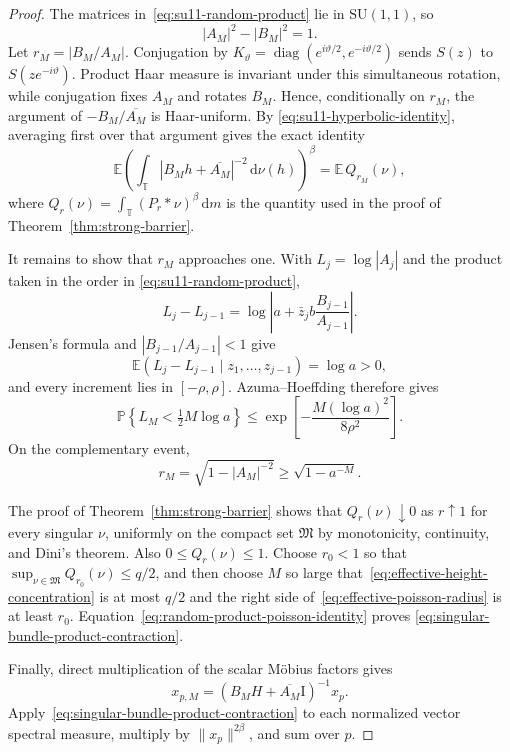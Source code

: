 \documentclass[11pt]{article}
\theoremstyle{remark}
\newcommand{\T}{\mathbb T}
\newcommand{\Id}{\mathrm I}
\newcommand{\dd}{\,\mathrm d}
\begin{document}
\begin{proof}
The matrices in~\eqref{eq:su11-random-product} lie in $\mathrm{SU}(1,1)$, so
\begin{equation}
 |A_M|^2-|B_M|^2=1.
 \label{eq:su11-hyperbolic-identity}
\end{equation}
Let $r_M=|B_M/A_M|$.  Conjugation by
$K_\vartheta=\operatorname{diag}(e^{i\vartheta/2},e^{-i\vartheta/2})$
sends $S(z)$ to $S(ze^{-i\vartheta})$.  Product Haar measure is invariant
under this simultaneous rotation, while conjugation fixes $A_M$ and rotates
$B_M$.  Hence, conditionally on $r_M$, the argument of
$-B_M/\overline{A_M}$ is Haar-uniform.  By
\eqref{eq:su11-hyperbolic-identity}, averaging first over that argument gives
the exact identity
\begin{equation}
 \mathbb E
 \left(
  \int_\T |B_Mh+\overline{A_M}|^{-2}\dd\nu(h)
 \right)^\beta
 =\mathbb E\,Q_{r_M}(\nu),
 \label{eq:random-product-poisson-identity}
\end{equation}
where $Q_r(\nu)=\int_\T(P_r*\nu)^\beta\dd m$ is the quantity used in the
proof of Theorem~\ref{thm:strong-barrier}.

It remains to show that $r_M$ approaches one.  With
$L_j=\log|A_j|$ and the product taken in the order in
\eqref{eq:su11-random-product},
\[
 L_j-L_{j-1}
 =\log\left|a+\bar z_jb\frac{B_{j-1}}{A_{j-1}}\right|.
\]
Jensen's formula and $|B_{j-1}/A_{j-1}|<1$ give
\begin{equation}
 \mathbb E(L_j-L_{j-1}\mid z_1,\ldots,z_{j-1})=\log a>0,
 \label{eq:positive-radial-drift}
\end{equation}
and every increment lies in $[-\rho,\rho]$.  Azuma--Hoeffding therefore gives
\begin{equation}
 \mathbb P\left\{L_M<\tfrac12M\log a\right\}
 \leq
 \exp\left[-\frac{M(\log a)^2}{8\rho^2}\right].
 \label{eq:effective-height-concentration}
\end{equation}
On the complementary event,
\begin{equation}
 r_M=\sqrt{1-|A_M|^{-2}}
 \geq\sqrt{1-a^{-M}}.
 \label{eq:effective-poisson-radius}
\end{equation}

The proof of Theorem~\ref{thm:strong-barrier} shows that
$Q_r(\nu)\downarrow0$ as $r\uparrow1$ for every singular $\nu$, uniformly on
the compact set $\mathfrak M$ by monotonicity, continuity, and Dini's theorem.
Also $0\leq Q_r(\nu)\leq1$.  Choose $r_0<1$ so that
$\sup_{\nu\in\mathfrak M}Q_{r_0}(\nu)\leq q/2$, and then choose $M$ so large
that~\eqref{eq:effective-height-concentration} is at most $q/2$ and the
right side of~\eqref{eq:effective-poisson-radius} is at least $r_0$.
Equation~\eqref{eq:random-product-poisson-identity} proves
\eqref{eq:singular-bundle-product-contraction}.

Finally, direct multiplication of the scalar M\"obius factors gives
\begin{equation}
 x_{p,M}=(B_MH+\overline{A_M}\Id)^{-1}x_p.
 \label{eq:collapsed-vector-recursion}
\end{equation}
Apply~\eqref{eq:singular-bundle-product-contraction} to each normalized vector
spectral measure, multiply by $\|x_p\|^{2\beta}$, and sum over $p$.
\end{proof}
\end{document}
